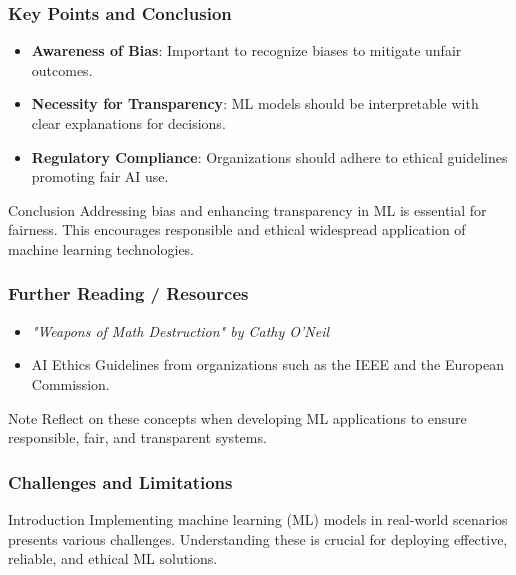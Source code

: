 \documentclass{beamer}
\begin{document}
\begin{frame}[fragile]
    \frametitle{Key Points and Conclusion}
    \begin{itemize}
        \item \textbf{Awareness of Bias}: Important to recognize biases to mitigate unfair outcomes.
        \item \textbf{Necessity for Transparency}: ML models should be interpretable with clear explanations for decisions.
        \item \textbf{Regulatory Compliance}: Organizations should adhere to ethical guidelines promoting fair AI use.
    \end{itemize}
    \begin{block}{Conclusion}
        Addressing bias and enhancing transparency in ML is essential for fairness. This encourages responsible and ethical widespread application of machine learning technologies.
    \end{block}
\end{frame}

\begin{frame}[fragile]
    \frametitle{Further Reading / Resources}
    \begin{itemize}
        \item \textit{"Weapons of Math Destruction" by Cathy O'Neil}
        \item AI Ethics Guidelines from organizations such as the IEEE and the European Commission.
    \end{itemize}
    \begin{block}{Note}
        Reflect on these concepts when developing ML applications to ensure responsible, fair, and transparent systems.
    \end{block}
\end{frame}

\begin{frame}[fragile]
    \frametitle{Challenges and Limitations}

    \begin{block}{Introduction}
        Implementing machine learning (ML) models in real-world scenarios presents various challenges. Understanding these is crucial for deploying effective, reliable, and ethical ML solutions.
    \end{block}
\end{frame}
\end{document}
